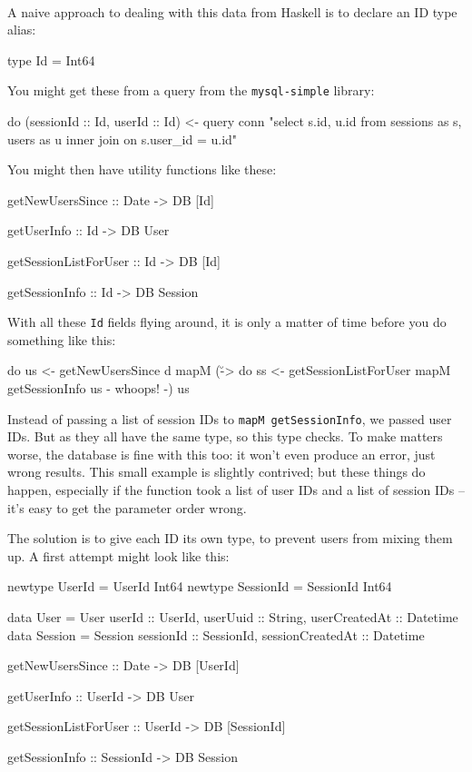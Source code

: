\documentclass{tmr}
\begin{document}
~\\

A naive approach to dealing with this data from Haskell is to declare an ID type alias:

\begin{code}
type Id = Int64
\end{code}

You might get these from a query from the \texttt{mysql-simple} library:

\begin{code}
do (sessionId :: Id, userId :: Id) <- query conn "select s.id, u.id
      from sessions as s, users as u inner join on s.user_id = u.id"
\end{code}

You might then have utility functions like these:

\begin{code}
getNewUsersSince :: Date -> DB [Id]

getUserInfo :: Id -> DB User

getSessionListForUser :: Id -> DB [Id]

getSessionInfo :: Id -> DB Session
\end{code}

With all these \lstinline|Id| fields flying around, it is only a matter of time before you do something like this:

\begin{code}
do us <- getNewUsersSince d
   mapM (\u -> do ss <- getSessionListForUser
                  mapM getSessionInfo us {- whoops! -}) us
\end{code}%

Instead of passing a list of session IDs to \lstinline|mapM getSessionInfo|, we passed user IDs.  But as they all have the same type, so this type checks. To make matters worse, the database is fine with this too: it won't even produce an error, just wrong results.  This small example is slightly contrived; but these things do happen, especially if the function took a list of user IDs and a list of session IDs -- it's easy to get the parameter order wrong.

The solution is to give each ID its own type, to prevent users from mixing them up.  A first attempt might look like this:

\begin{code}
newtype UserId = UserId Int64
newtype SessionId = SessionId Int64

data User = User { userId :: UserId,
                   userUuid :: String,
                   userCreatedAt :: Datetime }
data Session = Session { sessionId :: SessionId,
                         sessionCreatedAt :: Datetime }

getNewUsersSince :: Date -> DB [UserId]

getUserInfo :: UserId -> DB User

getSessionListForUser :: UserId -> DB [SessionId]

getSessionInfo :: SessionId -> DB Session
\end{code}
\end{document}
